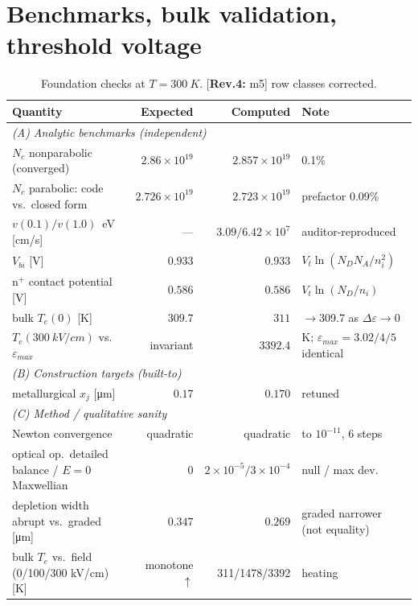 \documentclass[11pt]{article}
\newcommand{\eps}{\varepsilon}
\newcommand{\fix}[1]{\textcolor{green!45!black}{\small[\textbf{Rev.4:} #1]}}
\begin{document}
\section{Benchmarks, bulk validation, threshold voltage}\label{sec:bench}
\begin{table}[h]\centering\small
\caption{Foundation checks at $T=\SI{300}{K}$. \fix{m5} row classes corrected.}\label{tab:bench}
\begin{tabular}{p{5.4cm}r r p{3.3cm}}
\toprule
Quantity & Expected & Computed & Note\\
\midrule
\multicolumn{4}{l}{\emph{(A) Analytic benchmarks (independent)}}\\
$N_c$ nonparabolic (converged) & $2.86\times10^{19}$ & $2.857\times10^{19}$ & 0.1\%\\
$N_c$ parabolic: code vs.\ closed form & $2.726\times10^{19}$ & $2.723\times10^{19}$ & prefactor 0.09\%\\
$v(0.1)/v(1.0)$~eV [cm/s] & --- & $3.09/6.42\times10^{7}$ & auditor-reproduced\\
$V_{bi}$ [V] & $0.933$ & $0.933$ & $V_t\ln(N_DN_A/n_i^2)$\\
n$^+$ contact potential [V] & $0.586$ & $0.586$ & $V_t\ln(N_D/n_i)$\\
bulk $T_e(0)$ [K] & $309.7$ & $311$ & $\to$309.7 as $\Delta\eps\to0$\\
$T_e(\SI{300}{kV/cm})$ vs.\ $\eps_{max}$ & invariant & $3392.4$ & K; $\eps_{max}{=}3.02/4/5$ identical\\
\midrule
\multicolumn{4}{l}{\emph{(B) Construction targets (built-to)}}\\
metallurgical $x_j$ [\si{\micro\meter}] & $0.17$ & $0.170$ & retuned\\
\midrule
\multicolumn{4}{l}{\emph{(C) Method / qualitative sanity}}\\
Newton convergence & quadratic & quadratic & to $10^{-11}$, 6 steps\\
optical op.\ detailed balance / $E{=}0$ Maxwellian & $0$ & $2\!\times\!10^{-5}/3\!\times\!10^{-4}$ & null / max dev.\\
depletion width abrupt vs.\ graded [\si{\micro\meter}] & $0.347$ & $0.269$ & graded narrower (not equality)\\
bulk $T_e$ vs.\ field (0/100/300 kV/cm) [K] & monotone$\uparrow$ & 311/1478/3392 & heating\\
\bottomrule
\end{tabular}
\end{table}
\end{document}
